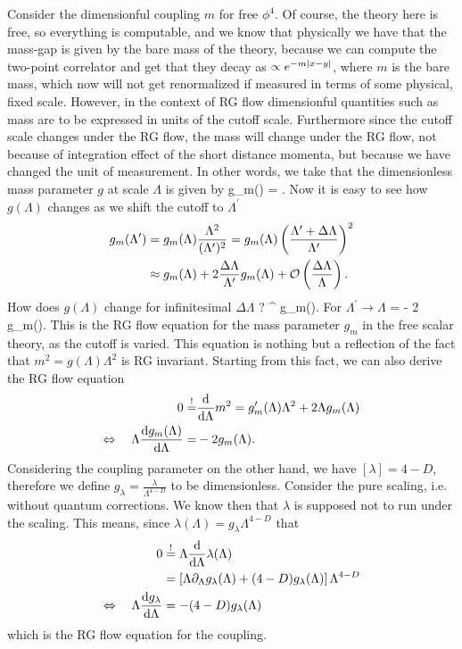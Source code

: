 Consider the dimensionful coupling $m$ for free $\phi^4$. Of course, the theory here is free, so everything is computable, and we know that physically we have that the mass-gap is given by the bare mass of the theory, because we can compute the two-point correlator and get that they decay as $\propto e^{-m \abs{x-y}}$, where $m$ is the bare mass, which now will not get renormalized if measured in terms of some physical, fixed scale. However, in the context of RG flow dimensionful quantities such as mass are to be expressed in units of the cutoff scale. Furthermore since the cutoff scale changes under the RG flow, the mass will change under the RG flow, not because of integration effect of the short distance momenta,  but because we have changed the unit of measurement. In other words, we take that the dimensionless mass parameter $g$ at scale $\Lambda$ is given by
\be
g_m(\Lambda) = .
\ee 
Now it is easy to see how $g(\Lambda)$ changes as we shift the cutoff to $\Lambda^\prime$
\begin{align*}
	g_m(\Lambda^\prime) &= g_m(\Lambda) \frac{\Lambda^2}{(\Lambda^\prime)^2} = g_m(\Lambda) \left(\frac{\Lambda^\prime + \Delta \Lambda}{\Lambda^\prime}\right)^2 \\
	&\approx g_m(\Lambda) + 2 \frac{\Delta \Lambda }{\Lambda^\prime} g_m(\Lambda) + \mathcal{O}\left(\frac{\Delta \Lambda}{\Lambda}\right).
\end{align*}
How does $g(\Lambda)$ change for infinitesimal $\Delta \Lambda$ ?
\bse 
\Lambda^\prime {}  g_m(\Lambda).
\ese 
For $\Lambda^\prime \rightarrow \Lambda$
\be 
\label{eq:renormWilsonmass}
\Lambda {} = - 2 g_m(\Lambda).
\ee 
This is the RG flow equation for the mass parameter $g_m$ in the free scalar theory, as the cutoff is varied. This equation is nothing but a reflection of the fact that $m^2=g(\Lambda) \Lambda^2$ is RG invariant. Starting from this fact, we can also derive the RG flow equation
\begin{align*}
	0 \stackrel{!}{=}& \frac{\mathrm{d}}{\mathrm{d} \Lambda} m^2=g_m^\prime(\Lambda) \Lambda^2 +2 \Lambda g_m(\Lambda) \\
	\Leftrightarrow \quad \Lambda \frac{\mathrm{d} g_m(\Lambda)}{\mathrm{d} \Lambda } =& - 2 g_m(\Lambda).
\end{align*}
Considering the coupling parameter on the other hand, we have $[\lambda]= 4-D$, therefore we define $g_\lambda = \frac{\lambda}{\Lambda^{4-D}}$ to be dimensionless. Consider the pure scaling, i.e. without quantum corrections. We know then that $\lambda$ is supposed not to run under the scaling. This means, since $\lambda(\Lambda) = g_\lambda \Lambda^{4-D}$ that
\begin{align}
	\label{eq:renormWilsoncoupling}
	0 & \stackrel{!}{=} \Lambda \frac{\mathrm{d}}{\mathrm{d} \Lambda } \lambda(\Lambda)\nonumber \\
	&= \left[\Lambda \partial_\Lambda g_\lambda(\Lambda) + (4-D) g_\lambda(\Lambda) \right] \Lambda^{4-D} \nonumber \\
	\Leftrightarrow \quad \Lambda \frac{\mathrm{d} g_\lambda}{\mathrm{d} \Lambda} &= - (4-D) g_\lambda (\Lambda) 
\end{align}
which is the RG flow equation for the coupling.



